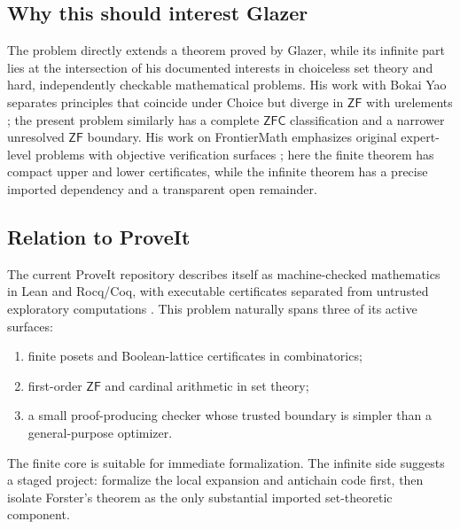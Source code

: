 \documentclass[11pt,letterpaper]{article}
\numberwithin{equation}{section}
\theoremstyle{plain}
\theoremstyle{definition}
\theoremstyle{remark}
\newcommand{\ZF}{\mathsf{ZF}}
\newcommand{\ZFC}{\mathsf{ZFC}}
\begin{document}
\subsection{Why this should interest Glazer}
The problem directly extends a theorem proved by Glazer, while its infinite
part lies at the intersection of his documented interests in choiceless set
theory and hard, independently checkable mathematical problems.  His work
with Bokai Yao separates principles that coincide under Choice but diverge in
$\ZF$ with urelements \cite{GlazerYao2026}; the present problem similarly has
a complete $\ZFC$ classification and a narrower unresolved $\ZF$ boundary.
His work on FrontierMath emphasizes original expert-level problems with
objective verification surfaces \cite{FrontierMath}; here the finite theorem
has compact upper and lower certificates, while the infinite theorem has a
precise imported dependency and a transparent open remainder.

\subsection{Relation to ProveIt}\label{bwc:sec:proveit}
The current ProveIt repository describes itself as machine-checked mathematics
in Lean and Rocq/Coq, with executable certificates separated from untrusted
exploratory computations \cite{ProveIt}.  This problem naturally spans three
of its active surfaces:
\begin{enumerate}
\item finite posets and Boolean-lattice certificates in combinatorics;
\item first-order $\ZF$ and cardinal arithmetic in set theory;
\item a small proof-producing checker whose trusted boundary is simpler than
      a general-purpose optimizer.
\end{enumerate}
The finite core is suitable for immediate formalization.  The infinite side
suggests a staged project: formalize the local expansion and antichain code
first, then isolate Forster's theorem as the only substantial imported
set-theoretic component.
\end{document}
